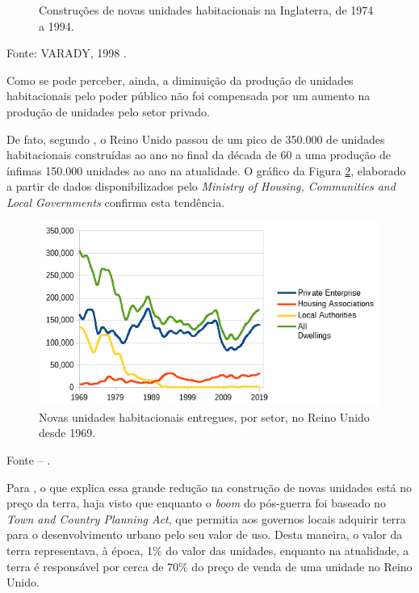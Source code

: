 \documentclass[
	12pt,				%
	oneside,			%
	a4paper,			%
	chapter=TITLE,		%
	section=TITLE,		%
	english,			%
	brazil				%
	]{abntex2}
\newcommand{\bcenter}{\begin{center}}
\newcommand{\ecenter}{\end{center}}
\begin{document}
\begin{refsection}
\begin{figure}[H]
{}

\caption{Construções de novas unidades habitacionais na Inglaterra, de 1974 a 1994.}\label{fig:inglaterra-unidades}
\end{figure}
\bcenter

Fonte: VARADY, 1998 \autocite[\emph{apud}][73]{jung2018}.
\ecenter

Como se pode perceber, ainda, a diminuição da produção de unidades habitacionais
pelo poder público não foi compensada por um aumento na produção de unidades
pelo setor privado.

De fato, segundo , o Reino Unido passou
de um pico de 350.000 de unidades habitacionais construídas ao ano no final da
década de 60 a uma produção de ínfimas 150.000 unidades ao ano na atualidade. O
gráfico da Figura \ref{fig:HUEngland}, elaborado a partir de dados
disponibilizados pelo \emph{Ministry of Housing, Communities and Local Governments}
confirma esta tendência.
\begin{figure}[H]

{\centering \includegraphics[width=0.7\linewidth]{images/HUEngland} 

}

\caption{Novas unidades habitacionais entregues, por setor, no Reino Unido desde 1969.}\label{fig:HUEngland}
\end{figure}
\bcenter

Fonte -- \textcite{HUEngland}.
\ecenter

Para , o que explica essa grande redução
na construção de novas unidades está no preço da terra, haja visto que enquanto
o \emph{boom} do pós-guerra foi baseado no \emph{Town and Country Planning Act}, que
permitia aos governos locais adquirir terra para o desenvolvimento urbano pelo
seu valor de uso. Desta maneira, o valor da terra
representava, à época, 1\% do valor das unidades, enquanto na atualidade, a terra
é responsável por cerca de 70\% do preço de venda de uma unidade no Reino Unido.


\end{refsection}
\end{document}
